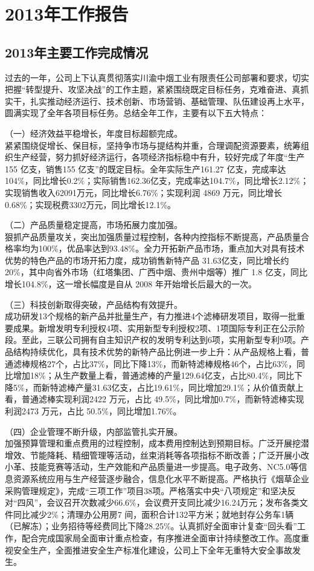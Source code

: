 ﻿\chapter{2013年工作报告}
\section{2013年主要工作完成情况}\sanhao
\indent 过去的一年，公司上下认真贯彻落实川渝中烟工业有限责任公司部署和要求，切实把握“转型提升、攻坚决战”的工作主题，紧紧围绕既定目标任务，克难奋进、真抓实干，扎实推动经济运行、技术创新、市场营销、基础管理、队伍建设再上水平，圆满实现了全年各项目标任务。总结全年工作，主要有以下五大特点：


（一）经济效益平稳增长，年度目标超额完成。\\
\indent 紧紧围绕促增长、保目标，坚持争市场与提结构并重，合理调配资源要素，统筹组织生产经营，努力抓好经济运行，各项经济指标稳中有升，较好完成了年度“生产 155 亿支，销售155 亿支”的既定目标。全年实际生产161.27 亿支，完成率达104\%，同比增长0.2\%；实际销售162.36亿支，完成率达104.7\%，同比增长2.12\%；实现销售收入62091万元，同比增长6.76\%；实现利润 4869 万元，同比增长0.68\%；实现税费3302万元，同比增长12.1\%。


（二）产品质量稳定提高，市场拓展力度加强。\\
\indent 狠抓产品质量攻关，突出加强质量过程控制，各种内控指标不断提高，产品质量合格率均为100\%，优品率达到93.48\%。全力开拓新产品市场，重点加大对具有技术优势的特色产品的市场开拓力度，成功销售新特产品 31.63亿支，同比增长约 20\%，其中向省外市场（红塔集团、广西中烟、贵州中烟等）推广 1.8 亿支，同比增长104.8\%，这一增长幅度是自从 2008 年开始增长后最大的一次。


（三）科技创新取得突破，产品结构有效提升。\\
\indent 成功研发13个规格的新产品并批量生产，有力推进4个滤棒研发项目，取得一批重要成果。新增发明专利授权4项、实用新型专利授权2项、1项国际专利正在公示阶段。至此，三联公司拥有自主知识产权的发明专利达到6项，实用新型专利9项。产品结构持续优化，具有技术优势的新特产品比例进一步上升：从产品规格上看，普通滤棒规格27个，占比37\%，同比下降13\%，而新特滤棒规格46个，占比63\%，同比增加18\%；从生产数量上看，普通滤棒的产量129.64亿支，占比80.4\%，同比下降5\%，而新特滤棒产量31.63亿支，占比19.61\%，同比增加29.1\%；从价值贡献上看，普通滤棒实现利润2422 万元，占比 49.5\%，同比增加0.7\%，而新特滤棒实现利润2473 万元，占比 50.5\%，同比增加1.76\%。

（四）企业管理不断升级，内部监管扎实开展。\\
\indent 加强预算管理和重点费用的过程控制，成本费用控制达到预期目标。广泛开展挖潜增效、节能降耗、精细管理等活动，丝束消耗等各项指标不断改善；广泛开展小改小革、技能竞赛等活动，生产效能和产品质量进一步提高。电子政务、NC5.0等信息资源系统应用与生产经营逐步融合，信息化水平不断提高。严格执行《烟草企业采购管理规定》，完成“三项工作”项目38项。严格落实中央“八项规定”和坚决反对“四风”，会议召开次数减少66.6\%，会议费开支同比减少16.24万元；发布各类文件同比减少2\%；清理办公用房7 间，面积合计132平方米；就地封存公务车1辆（已解冻）；业务招待等经费同比下降28.25\%。认真抓好全面审计复查“回头看”工作，配合完成国家局全面审计重点检查，有序推进全面审计持续整改工作。高度重视安全生产，全面推进安全生产标准化建设，公司上下全年无重特大安全事故发生。

